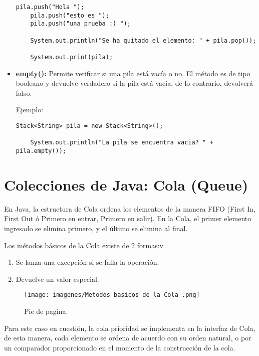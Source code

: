 \documentclass[12pt, letterpaper]{article} %
\begin{document}
\begin{itemize}
\begin{lstlisting}[frame=single]
    pila.push("Hola ");
    pila.push("esto es ");
    pila.push("una prueba :) ");

    System.out.println("Se ha quitado el elemento: " + pila.pop());

    System.out.print(pila);
    \end{lstlisting}

    \item \textbf{empty():} Permite verificar si una pila está vacía o no. El método es de tipo booleano y devuelve verdadero si la pila está vacía, de lo contrario, devolverá falso.

    Ejemplo:
    \lstset{language = Java, breaklines=true, basicstyle=\footnotesize}
    \begin{lstlisting}[frame=single]
    Stack<String> pila = new Stack<String>();

    System.out.println("La pila se encuentra vacia? " + pila.empty());
    \end{lstlisting}
\end{itemize}

\section{Colecciones de Java: Cola (Queue)}
En Java, la estructura de Cola ordena los elementos de la manera FIFO (First In, First Out ó Primero en entrar, Primero en salir). En la Cola, el primer elemento ingresado se elimina primero, y el último se elimina al final.
\vspace{5mm} 

Los métodos básicos de la Cola existe de 2 formas:v
\begin{enumerate}
    \item Se lanza una excepción si se falla la operación.
    \item Devuelve un valor especial.
\end{enumerate}
\begin{figure}[h]
    \centering
    \texttt{[image: imagenes/Metodos basicos de la Cola .png]}
    \caption{Pie de pagina.}
    \label{fig:tabla}
\end{figure}
Para este caso en cuestión, la cola prioridad se implementa en la interfaz de Cola, de esta manera, cada elemento se ordena de acuerdo con su orden natural, o por un comparador proporcionado en el momento de la construcción de la cola.
\end{document}

